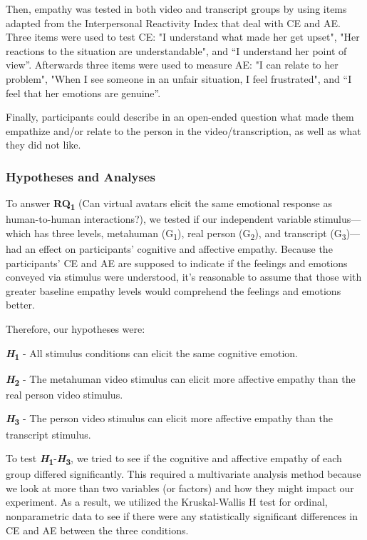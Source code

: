 Then, empathy was tested in both video and transcript groups by using items adapted from the Interpersonal Reactivity Index \cite{DAV83} that deal with  CE and AE. Three items were used to test CE: "I understand what made her get upset", "Her reactions to the situation are understandable", and “I understand her point of view”. Afterwards three items were used to measure AE: "I can relate to her problem", "When I see someone in an unfair situation, I feel frustrated", and “I feel that her emotions are genuine”.

Finally, participants could describe in an open-ended question what made them empathize and/or relate to the person in the video/transcription, as well as what they did not like.

\subsubsection{Hypotheses and Analyses}
To answer \textbf{RQ\textsubscript{1}} (Can virtual avatars elicit the same emotional response as human-to-human interactions?), we tested if our independent variable stimulus---which has three levels, metahuman (G\textsubscript{1}), real person (G\textsubscript{2}), and transcript (G\textsubscript{3})---had an effect on participants' cognitive and affective empathy. Because the participants' CE and AE are supposed to indicate if the feelings and emotions conveyed via stimulus were understood, it's reasonable to assume that those with greater baseline empathy levels would comprehend the feelings and emotions better.

Therefore, our hypotheses were:

\textbf{\textit{H}\textsubscript{1}} - All stimulus conditions can elicit the same cognitive emotion.

\textbf{\textit{H}\textsubscript{2}} - The metahuman video stimulus can elicit more affective empathy than the real person video stimulus.

\textbf{\textit{H}\textsubscript{3}} - The person video stimulus can elicit more affective empathy than the transcript stimulus.

To test \textbf{\textit{H}\textsubscript{1}}-\textbf{\textit{H}\textsubscript{3}}, we tried to see if the cognitive and affective empathy of each group differed significantly. This required a multivariate analysis method because we look at more than two variables (or factors) and how they might impact our experiment. As a result, we utilized the Kruskal-Wallis H test for ordinal, nonparametric data to see if there were any statistically significant differences in CE and AE between the three conditions.

